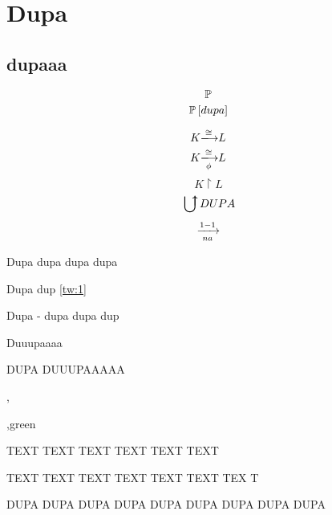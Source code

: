 \documentclass{article}
\begin{document}
\section{Dupa}
\subsection{dupaaa}

$$\prob$$
$$\prob{dupa}$$

$$K\isomorphism L$$
$$K\isomorphism{\phi}L $$
$$K\restriction L$$
$$\abigcup DUPA$$
$$ \xrightarrow[na]{1-1}$$

\begin{theorem}\label{tw:1}
Dupa dupa dupa dupa
\end{theorem}

\begin{lemma}  
Dupa dup \cref{tw:1}
\end{lemma}

\begin{definition}[dupaaaa]
Dupa - dupa dupa dup
\end{definition}

\begin{remark}[remark1]
Duuupaaaa
\end{remark}

\begin{fact}
DUPA  DUUUPAAAAA
\end{fact}

\sep

\sep{green}

TEXT TEXT  TEXT TEXT TEXT TEXT

\findent TEXT TEXT TEXT TEXT TEXT TEXT TEX T
\listoftheorems[showall]
  
\begin{bbox}
 DUPA DUPA DUPA DUPA DUPA DUPA DUPA DUPA DUPA
\end{bbox}
\end{document}
